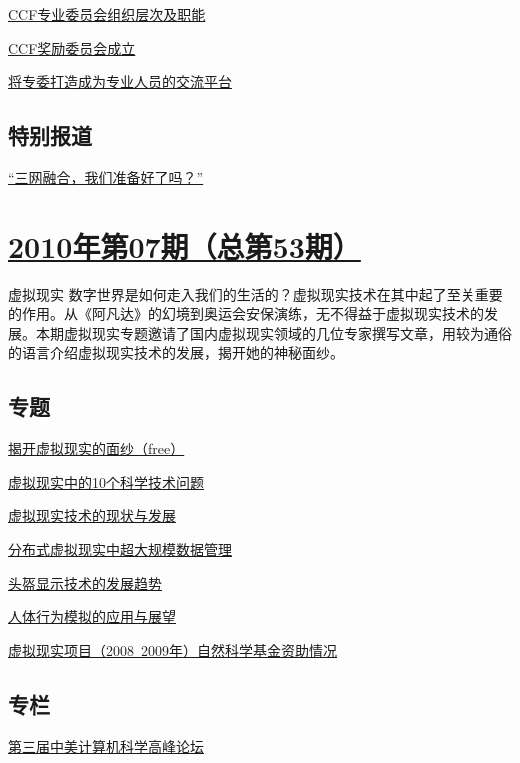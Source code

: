 \documentclass[a4paper]{article}
\begin{document}
\href{http://history.ccf.org.cn/resources/1190201776262/2010/08/12/201008-15.pdf}{CCF专业委员会组织层次及职能}

\href{http://history.ccf.org.cn/resources/1190201776262/2010/08/12/201008-16.pdf}{CCF奖励委员会成立}

\href{http://history.ccf.org.cn/resources/1190201776262/2010/08/12/201008-17.pdf}{将专委打造成为专业人员的交流平台}

\subsection{特别报道}
\href{http://history.ccf.org.cn/resources/1190201776262/2010/08/12/201008-13.pdf}{“三网融合，我们准备好了吗？”}


\section{\href{http://history.ccf.org.cn/sites/ccf/jsjtbbd.jsp?contentId=2558164128410}{\textbf{2010年第07期（总第53期）}}}
虚拟现实 数字世界是如何走入我们的生活的？虚拟现实技术在其中起了至关重要的作用。从《阿凡达》的幻境到奥运会安保演练，无不得益于虚拟现实技术的发展。本期虚拟现实专题邀请了国内虚拟现实领域的几位专家撰写文章，用较为通俗的语言介绍虚拟现实技术的发展，揭开她的神秘面纱。
\subsection{专题}
\href{http://history.ccf.org.cn/resources/1190201776262/2010/07/15/201007-1.pdf}{揭开虚拟现实的面纱（free）}

\href{http://history.ccf.org.cn/resources/1190201776262/2010/07/15/201007-2.pdf}{虚拟现实中的10个科学技术问题}

\href{http://history.ccf.org.cn/resources/1190201776262/2010/07/15/201007-3.pdf}{虚拟现实技术的现状与发展}

\href{http://history.ccf.org.cn/resources/1190201776262/2010/07/15/201007-4.pdf}{分布式虚拟现实中超大规模数据管理}

\href{http://history.ccf.org.cn/resources/1190201776262/2010/08/17/2010.7.23-28.pdf}{头盔显示技术的发展趋势}

\href{http://history.ccf.org.cn/resources/1190201776262/2010/07/15/201007-6.pdf}{人体行为模拟的应用与展望}

\href{http://history.ccf.org.cn/resources/1190201776262/2010/07/15/201007-7.pdf}{虚拟现实项目（2008~2009年）自然科学基金资助情况}

\subsection{专栏}
\href{http://history.ccf.org.cn/resources/1190201776262/2010/07/15/2010.7 xiao-36.pdf}{第三届中美计算机科学高峰论坛}
\end{document}
